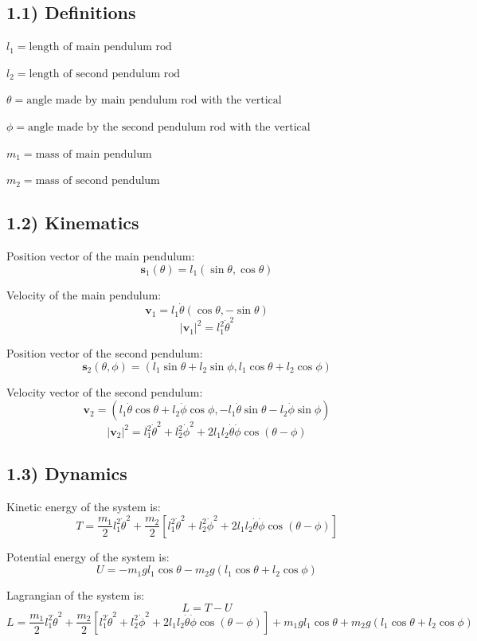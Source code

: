 \documentclass[12pt]{article}
\begin{document}
\subsection*{1.1) Definitions}

$l_1=\text{length of main pendulum rod}$

$l_2=\text{length of second pendulum rod}$

$\theta=\text{angle made by main pendulum rod with the vertical}$

$\phi=\text{angle made by the second pendulum rod with the vertical}$

$m_1=\text{mass of main pendulum}$

$m_2=\text{mass of second pendulum}$

\subsection*{1.2) Kinematics}

Position vector of the main pendulum:
\[
\mathbf{s}_1(\theta)=l_1(\sin\theta,\cos\theta)
\]

Velocity of the main pendulum:
\[
\mathbf{v}_1=l_1\dot{\theta}(\cos\theta,-\sin\theta)
\]
\[
|\mathbf{v}_1|^2=l_1^2\dot{\theta}^2
\]

Position vector of the second pendulum:
\[
\mathbf{s}_2(\theta,\phi)
=(l_1\sin\theta+l_2\sin\phi,l_1\cos\theta+l_2\cos\phi)
\]

Velocity vector of the second pendulum:
\[
\mathbf{v}_2
=(l_1\dot{\theta}\cos\theta+l_2\dot{\phi}\cos\phi,
-l_1\dot{\theta}\sin\theta-l_2\dot{\phi}\sin\phi)
\]
\[
|\mathbf{v}_2|^2
=l_1^2\dot{\theta}^2+l_2^2\dot{\phi}^2
+2l_1l_2\dot{\theta}\dot{\phi}\cos(\theta-\phi)
\]

\subsection*{1.3) Dynamics}

Kinetic energy of the system is:
\[
T=\frac{m_1}{2}l_1^2\dot{\theta}^2
+\frac{m_2}{2}\left[
l_1^2\dot{\theta}^2+l_2^2\dot{\phi}^2
+2l_1l_2\dot{\theta}\dot{\phi}\cos(\theta-\phi)
\right]
\]

Potential energy of the system is:
\[
U=-m_1gl_1\cos\theta-m_2g(l_1\cos\theta+l_2\cos\phi)
\]

Lagrangian of the system is:
\[
L=T-U
\]
\[
L=\frac{m_1}{2}l_1^2\dot{\theta}^2
+\frac{m_2}{2}\left[
l_1^2\dot{\theta}^2+l_2^2\dot{\phi}^2
+2l_1l_2\dot{\theta}\dot{\phi}\cos(\theta-\phi)
\right]
+m_1gl_1\cos\theta+m_2g(l_1\cos\theta+l_2\cos\phi)
\]
\end{document}
